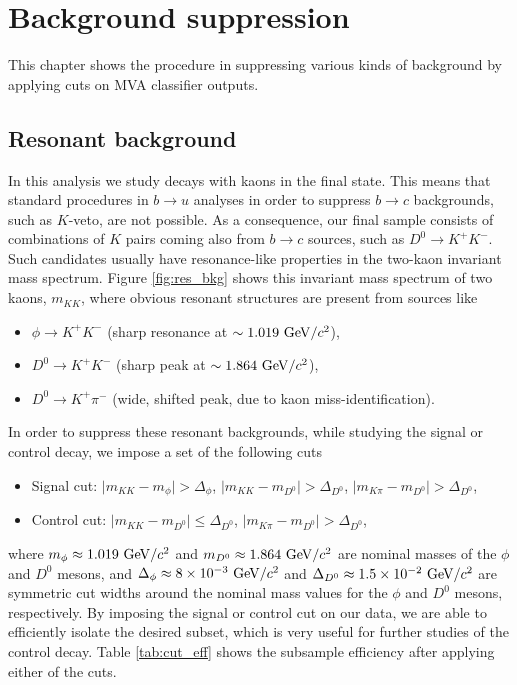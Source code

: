 \chapter{Background suppression}\label{sec:background-suppression}

This chapter shows the procedure in suppressing various kinds of background by applying cuts on MVA classifier outputs. 

\section{Resonant background}

In this analysis we study decays with kaons in the final state. This means that standard procedures in $b \to u$ analyses in order to suppress $b \to c$ backgrounds, such as $K$-veto, are not possible. As a consequence, our final sample consists of combinations of $K$ pairs coming also from $b \to c$  sources, such as $D^0 \to K^+ K^-$. Such candidates usually have resonance-like properties in the two-kaon invariant mass spectrum. Figure \ref{fig:res_bkg} shows this invariant mass spectrum of two kaons, $m_{KK}$, where obvious resonant structures are present from sources like
\begin{itemize}
\item $\phi \to K^+K^-$ (sharp resonance at $\sim1.019\mathrm{~GeV}/c^2$),
\item $D^0 \to K^+K^-$ (sharp peak at $\sim 1.864\mathrm{~GeV}/c^2$),
\item $D^0 \to K^+ \pi^-$ (wide, shifted peak, due to kaon miss-identification).
\end{itemize}

In order to suppress these resonant backgrounds, while studying the signal or control decay, we impose a set of the following cuts
\begin{itemize}
\item Signal cut: $\vert m_{KK} - m_{\phi} \vert > \Delta_\phi$, $\vert m_{KK} - m_{D^0} \vert > \Delta_{D^0}$, $\vert m_{K\pi} - m_{D^0} \vert > \Delta_{D^0}$,
\item Control cut: $\vert m_{KK} - m_{D^0} \vert \leq \Delta_{D^0}$, $\vert m_{K\pi} - m_{D^0} \vert > \Delta_{D^0}$,
\end{itemize}

where $m_\phi \approx 1.019\mathrm{~GeV}/c^2$ and $m_{D^0} \approx 1.864\mathrm{~GeV}/c^2$ are nominal masses of the $\phi$ and $D^0$ mesons, and $\Delta_\phi \approx 8\times 10^{-3}\mathrm{~GeV}/c^2$ and $\Delta_{D^0} \approx 1.5\times 10^{-2}\mathrm{~GeV}/c^2$ are symmetric cut widths around the nominal mass values for the $\phi$ and $D^0$ mesons, respectively. By imposing the signal or control cut on our data, we are able to efficiently isolate the desired subset, which is very useful for further studies of the control decay. Table \ref{tab:cut_eff} shows the subsample efficiency after applying either of the cuts.

